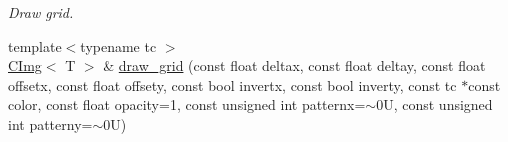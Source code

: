 \begin{DoxyCompactItemize}
\begin{DoxyCompactList}\small\item\em Draw grid. \item\end{DoxyCompactList}\item 
\hypertarget{structcimg__library_1_1CImg_a606cde6d7312d1cc49e6b15524e44c6c}{
{\footnotesize template$<$typename tc $>$ }\\\hyperlink{structcimg__library_1_1CImg}{CImg}$<$ T $>$ \& \hyperlink{structcimg__library_1_1CImg_a606cde6d7312d1cc49e6b15524e44c6c}{draw\_\-grid} (const float deltax, const float deltay, const float offsetx, const float offsety, const bool invertx, const bool inverty, const tc $\ast$const color, const float opacity=1, const unsigned int patternx=$\sim$0U, const unsigned int patterny=$\sim$0U)}
\label{structcimg__library_1_1CImg_a606cde6d7312d1cc49e6b15524e44c6c}


\end{DoxyCompactItemize}

